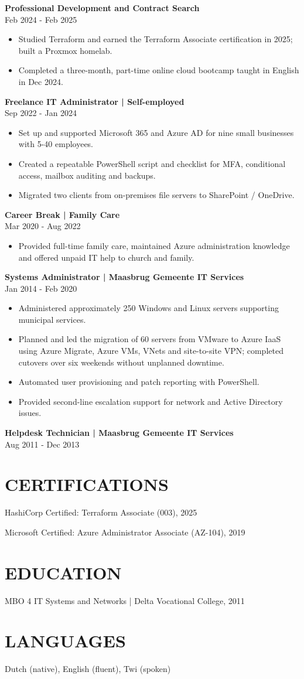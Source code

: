 \documentclass[11pt,a4paper]{article}
\newcommand{\cvsection}[1]{\section*{#1}}
\newcommand{\cvrole}[2]{\par\addvspace{0.5em}\noindent\textbf{#1}\\#2\par}
\begin{document}
\newpage
\cvrole{Professional Development and Contract Search}{Feb 2024 - Feb 2025}
\begin{itemize}
\item Studied Terraform and earned the Terraform Associate certification in 2025; built a Proxmox homelab.
\item Completed a three-month, part-time online cloud bootcamp taught in English in Dec 2024.
\end{itemize}

\cvrole{Freelance IT Administrator | Self-employed}{Sep 2022 - Jan 2024}
\begin{itemize}
\item Set up and supported Microsoft 365 and Azure AD for nine small businesses with 5-40 employees.
\item Created a repeatable PowerShell script and checklist for MFA, conditional access, mailbox auditing and backups.
\item Migrated two clients from on-premises file servers to SharePoint / OneDrive.
\end{itemize}

\cvrole{Career Break | Family Care}{Mar 2020 - Aug 2022}
\begin{itemize}
\item Provided full-time family care, maintained Azure administration knowledge and offered unpaid IT help to church and family.
\end{itemize}

\cvrole{Systems Administrator | Maasbrug Gemeente IT Services}{Jan 2014 - Feb 2020}
\begin{itemize}
\item Administered approximately 250 Windows and Linux servers supporting municipal services.
\item Planned and led the migration of 60 servers from VMware to Azure IaaS using Azure Migrate, Azure VMs, VNets and site-to-site VPN; completed cutovers over six weekends without unplanned downtime.
\item Automated user provisioning and patch reporting with PowerShell.
\item Provided second-line escalation support for network and Active Directory issues.
\end{itemize}

\cvrole{Helpdesk Technician | Maasbrug Gemeente IT Services}{Aug 2011 - Dec 2013}

\cvsection{CERTIFICATIONS}
HashiCorp Certified: Terraform Associate (003), 2025\par
Microsoft Certified: Azure Administrator Associate (AZ-104), 2019

\cvsection{EDUCATION}
MBO 4 IT Systems and Networks | Delta Vocational College, 2011

\cvsection{LANGUAGES}
Dutch (native), English (fluent), Twi (spoken)
\end{document}
